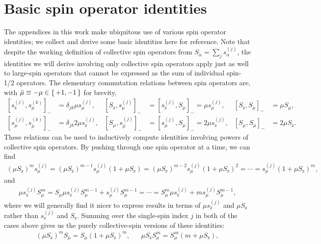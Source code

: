\documentclass[aps,pra,twocolumn,longbibliography]{revtex4-2}
\newcommand{\p}[1]{\left( #1 \right)} %
\renewcommand{\sp}[1]{\left[ #1 \right]} %
\newcommand{\z}{\text{z}}
\newcommand{\bmu}{{\bar\mu}}
\newcommand{\1}{\mathds{1}}
\renewcommand{\a}{\alpha} %
\begin{document}
\onecolumngrid
\appendix

\section{Basic spin operator identities}
\label{sec:identities}

The appendices in this work make ubiquitous use of various spin
operator identities; we collect and derive some basic identities here
for reference.  Note that despite the working definition of collective
spin operators from $S_\a=\sum_js_\a^{(j)}$, the identities we will
derive involving only collective spin operators apply just as well to
large-spin operators that cannot be expressed as the sum of individual
spin-1/2 operators.  The elementary commutation relations between spin
operators are, with $\bmu\equiv-\mu\in\set{+1,-1}$ for brevity,
\begin{align}
  \sp{s_\z^{(j)},s_\mu^{(k)}}_-
  &= \delta_{jk} \mu s_\mu^{(j)},
  &
  \sp{S_\z,s_\mu^{(j)}}_-
  &= \sp{s_\z^{(j)},S_\mu}_- = \mu s_\mu^{(j)},
  &
  \sp{S_\z,S_\mu}_-
  &= \mu S_\mu,
  \label{eq:comm_z_base} \\
  \sp{s_\mu^{(j)},s_\bmu^{(k)}}_-
  &= \delta_{jk} 2 \mu s_\z^{(j)},
  &
  \sp{S_\mu,s_\bmu^{(j)}}_-
  &= \sp{s_\mu^{(j)},S_\bmu}_- = 2 \mu s_\z^{(j)},
  &
  \sp{S_\mu,S_\bmu}_-
  &= 2 \mu S_\z.
  \label{eq:comm_mu_base}
\end{align}
These relations can be used to inductively compute identities
involving powers of collective spin operators.  By pushing through one
spin operator at a time, we can find
\begin{align}
  \p{\mu S_\z}^m s_\mu^{(j)}
  = \p{\mu S_\z}^{m-1} s_\mu^{(j)} \p{1 + \mu S_\z}
  = \p{\mu S_\z}^{m-2} s_\mu^{(j)} \p{1 + \mu S_\z}^2
  = \cdots
  = s_\mu^{(j)} \p{1 + \mu S_\z}^m,
  \label{eq:push_z_mu_Ss}
\end{align}
and
\begin{align}
  \mu s_\z^{(j)} S_\mu^m
  = S_\mu \mu s_\z^{(j)} S_\mu^{m-1} + s_\mu^{(j)} S_\mu^{m-1}
  = \cdots
  = S_\mu^m \mu s_\z^{(j)} + ms_\mu^{(j)} S_\mu^{m-1},
  \label{eq:push_z_mu_sS}
\end{align}
where we will generally find it nicer to express results in terms of
$\mu s_\z^{(j)}$ and $\mu S_\z$ rather than $s_\z^{(j)}$ and $S_\z$.
Summing over the single-spin index $j$ in both of the cases above
gives us the purely collective-spin versions of these identities:
\begin{align}
  \p{\mu S_\z}^m S_\mu = S_\mu \p{1 + \mu S_\z}^m,
  &&
  \mu S_\z S_\mu^m = S_\mu^m \p{m + \mu S_\z},
  \label{eq:push_z_mu_single}
\end{align}
\end{document}
